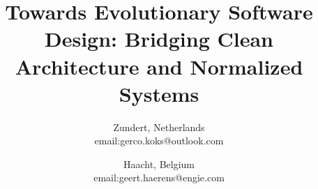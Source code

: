 \title{\bfseries\Large Towards Evolutionary Software Design: Bridging Clean Architecture and Normalized Systems}

\author{
Zundert, Netherlands \\
email:gerco.koks@outlook.com
\and
{}
Haacht, Belgium \\
email:geert.haerens@engie.com}

\maketitle
